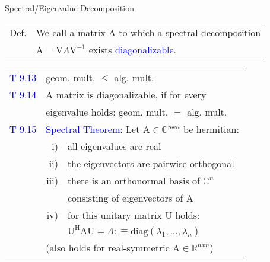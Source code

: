 \begin{mainbox}{Spectral/Eigenvalue Decomposition}
\setlength{\tabcolsep}{2pt}
\begin{tabular}{rl}
	Def. & We call a matrix A to which a spectral decomposition\\
	& A$=\text{V}\Lambda\text{V}^{-1}$ exists \textcolor{blue}{diagonalizable}.\\
\end{tabular}
\end{mainbox}
\begin{mainbox}{}
\setlength{\tabcolsep}{2pt}
\begin{tabular}{rrl}
	\textcolor{blue}{T 9.13} & \multicolumn{2}{l}{geom. mult. $\leq$ alg. mult.}\\
	\rule{0pt}{3ex}
	\textcolor{blue}{T 9.14} & \multicolumn{2}{l}{A matrix is diagonalizable, if for every}\\
	& \multicolumn{2}{l}{eigenvalue holds: geom. mult. $=$ alg. mult.}\\
	\rule{0pt}{3ex}
	\textcolor{blue}{T 9.15} & \multicolumn{2}{l}{\textcolor{blue}{Spectral Theorem}: Let A$\in\mathbb{C}^{nxn}$ be hermitian:}\\
	& i) & all eigenvalues are real\\
	& ii) & the eigenvectors are pairwise orthogonal\\
	& iii) & there is an orthonormal basis of $\mathbb{C}^n$\\
	& & consisting of eigenvectors of A\\
	& iv) & for this unitary matrix U holds:\\
	& & $\text{U}^\text{H}\text{AU} = \Lambda :\equiv \text{diag}(\lambda_1, ..., \lambda_n)$\\
	& \multicolumn{2}{l}{(also holds for real-symmetric A$\in\mathbb{R}^{nxn}$)}\\
\end{tabular}
\end{mainbox}